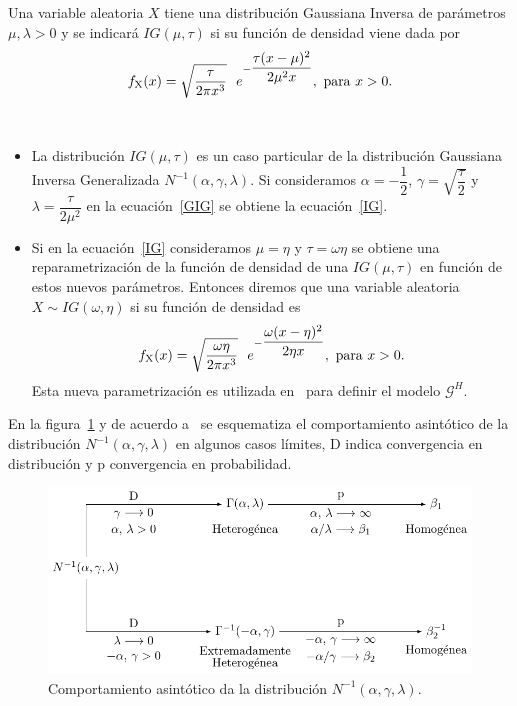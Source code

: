 \begin{definition}
	\label{InversaGaussiana}
	Una variable aleatoria $X$ tiene una distribución Gaussiana Inversa de parámetros $\mu, \lambda >0$  y se indicará $IG(\mu,\tau)$ si su función de densidad viene dada por
	\begin{align}
	\label{IG}
	f_{\text X}(x)=\sqrt{\dfrac{\tau}{2 \pi x^3}} \ \ e^{- \dfrac{\tau (x-\mu)^2}{2 \mu^2 x}}, \text{ para } x>0.
	\end{align}
\end{definition}

\begin{remark} \ 
	\begin{itemize}
		\item La distribución $IG(\mu,\tau)$ es un caso particular de la distribución Gaussiana Inversa Generalizada $N^{-1}(\alpha,\gamma,\lambda)$. Si consideramos $\alpha=-\dfrac{1}{2}$, $\gamma=\sqrt{\dfrac{\tau}{2}}$ y $\lambda=\dfrac{\tau}{2\mu^2}$ en la ecuación~\eqref{GIG} se obtiene la ecuación~\eqref{IG}.
		\item Si en la ecuación~\eqref{IG} consideramos $\mu=\eta$ y $\tau=\omega \eta$ se obtiene una reparametrización de la función de densidad de una $IG(\mu,\tau)$ en función de estos nuevos parámetros. Entonces diremos que una variable aleatoria $X \sim IG(\omega,\eta)$ si su función de densidad es 
		\begin{align}
		\label{OtraIG}
		f_{\text X}(x)=\sqrt{\dfrac{\omega \eta}{2 \pi x^3}} \ \ e^{- \dfrac{\omega (x-\eta)^2}{2 \eta x}}, \text{ para } x>0.
		\end{align}
		Esta nueva parametrización es utilizada en~\citet{Buemi2009} para definir el modelo $\mathcal{G}^H$.
	\end{itemize} 
\end{remark}


En la figura~\ref{RelacionInversaGaussiana} y de acuerdo a~\citet{Frery99} se esquematiza el comportamiento asintótico de la distribución $N^{-1}(\alpha,\gamma,\lambda)$ en algunos casos límites, D indica convergencia en distribución y p convergencia en probabilidad.

\begin{figure}[hbt]
	\centering    
	\includegraphics[scale=1]{../../Figures/Tesis/Capitulo4/RelacionInversaGaussiana.pdf}
	\caption{\label{RelacionInversaGaussiana}Comportamiento asintótico da la distribución $N^{-1}(\alpha,\gamma,\lambda)$.} %
\end{figure} 


